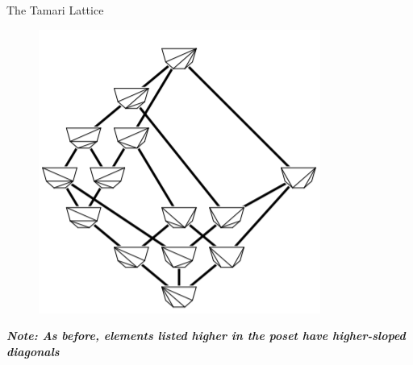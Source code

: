 \documentclass[xcolor=x11names,compress,t]{beamer}
\begin{document}
\begin{frame}{The Tamari Lattice}
    \begin{figure}
        \centering
        \includegraphics[scale = 0.7]{Capture1.PNG}
    \end{figure}
    \emph{\textbf{Note: As before, elements listed higher in the poset have higher-sloped diagonals}}
\end{frame}
\end{document}
